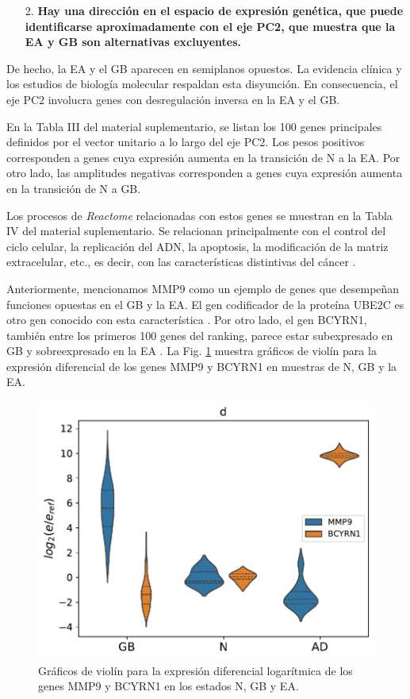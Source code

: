 \begin{enumerate}
	\item[2.] \textbf{Hay una dirección en el espacio de expresión genética, que puede identificarse aproximadamente con el eje PC2, que muestra que la EA y GB son alternativas excluyentes.}
\end{enumerate}

De hecho, la EA y el GB aparecen en semiplanos opuestos. La evidencia clínica \cite{ou2012does, Driver_2012, Roe_2010, Musicco_2013} y los estudios de biología molecular \cite{Liu_2013, Lanni_2020} respaldan esta disyunción. En consecuencia, el eje PC2 involucra genes con desregulación inversa en la EA y el GB.

\alert{En la Tabla III del material suplementario}, se listan los 100 genes principales definidos por el vector unitario a lo largo del eje PC2. Los pesos positivos corresponden a genes cuya expresión aumenta en la transición de N a la EA. Por otro lado, las amplitudes negativas corresponden a genes cuya expresión aumenta en la transición de N a GB.

Los procesos de \textit{Reactome} relacionadas con estos genes se muestran en la \alert{Tabla IV del material suplementario}. Se relacionan principalmente con el control del ciclo celular, la replicación del ADN, la apoptosis, la modificación de la matriz extracelular, etc., es decir, con las características distintivas del cáncer \cite{Hanahan_2000, Hanahan_2011, Hanahan_2022}.

Anteriormente, mencionamos MMP9 como un ejemplo de genes que desempeñan funciones opuestas en el GB y la EA. El gen codificador de la proteína UBE2C es otro gen conocido con esta característica \cite{MA_2016, Jaladanki_2021}. Por otro lado, el gen BCYRN1, también entre los primeros 100 genes del ranking, parece estar subexpresado en GB \cite{Mu2021} y sobreexpresado en la EA \cite{Zhang_2021}. La Fig. \ref{fig:fig1d} muestra gráficos de violín para la expresión diferencial de los genes MMP9 y BCYRN1 en muestras de N, GB y la EA.

\begin{figure}[!htb]
	\centering
	\includegraphics[width=0.75\linewidth]{figures/Fig_1d.pdf}
	\caption{Gráficos de violín para la expresión diferencial logarítmica de los genes MMP9 y BCYRN1 en los estados N, GB y EA.}
	\label{fig:fig1d}
\end{figure}

